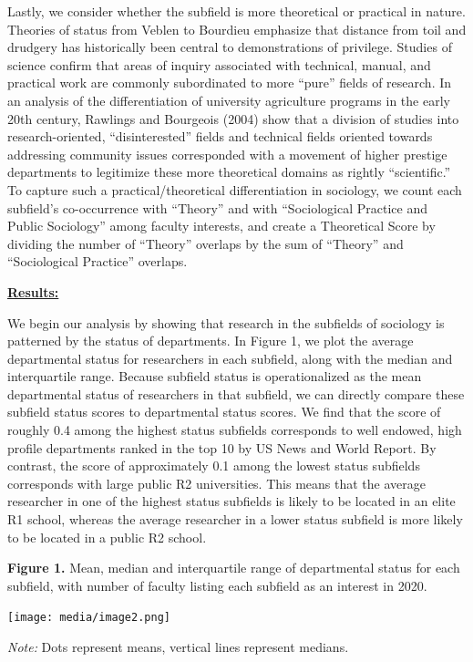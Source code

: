 \documentclass{article}
\begin{document}
Lastly, we consider whether the subfield is more theoretical or
practical in nature. Theories of status from Veblen to Bourdieu
emphasize that distance from toil and drudgery has historically been
central to demonstrations of privilege. Studies of science confirm that
areas of inquiry associated with technical, manual, and practical work
are commonly subordinated to more ``pure'' fields of research. In an
analysis of the differentiation of university agriculture programs in
the early 20th century, Rawlings and Bourgeois (2004) show that a
division of studies into research-oriented, ``disinterested'' fields and
technical fields oriented towards addressing community issues
corresponded with a movement of higher prestige departments to
legitimize these more theoretical domains as rightly ``scientific.'' To
capture such a practical/theoretical differentiation in sociology, we
count each subfield's co-occurrence with ``Theory'' and with
``Sociological Practice and Public Sociology'' among faculty interests,
and create a Theoretical Score by dividing the number of ``Theory''
overlaps by the sum of ``Theory'' and ``Sociological Practice''
overlaps.

\textbf{\uline{Results:}}

We begin our analysis by showing that research in the subfields of
sociology is patterned by the status of departments. In Figure 1, we
plot the average departmental status for researchers in each subfield,
along with the median and interquartile range. Because subfield status
is operationalized as the mean departmental status of researchers in
that subfield, we can directly compare these subfield status scores to
departmental status scores. We find that the score of roughly 0.4 among
the highest status subfields corresponds to well endowed, high profile
departments ranked in the top 10 by US News and World Report. By
contrast, the score of approximately 0.1 among the lowest status
subfields corresponds with large public R2 universities. This means that
the average researcher in one of the highest status subfields is likely
to be located in an elite R1 school, whereas the average researcher in a
lower status subfield is more likely to be located in a public R2
school.

\textbf{Figure 1.} Mean, median and interquartile range of departmental
status for each subfield, with number of faculty listing each subfield
as an interest in 2020.

\texttt{[image: media/image2.png]}

\emph{Note:} Dots represent means, vertical lines represent medians.
\end{document}
